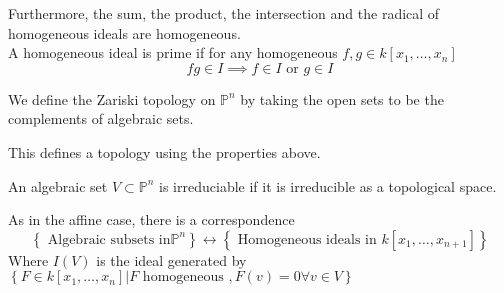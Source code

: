 \documentclass[../main.tex]{subfiles}
\begin{document}
Furthermore, the sum, the product, the intersection and the radical of homogeneous ideals are homogeneous.\\
A homogeneous ideal is prime if for any homogeneous $f,g\in k[x_1,\ldots,x_n]$ 
\[ 
fg\in I \implies f\in I \text{ or } g\in I
\]
\begin{defn}
We define the Zariski topology on $ \mathbb{P}^{n}$ by taking the open sets to be the complements of algebraic sets.	
\end{defn}
This defines a topology using the properties above.
\begin{defn}
	An algebraic set $V \subset \mathbb{P}^{n}$ is irreduciable if it is irreducible as a topological space.
\end{defn}
As in the affine case, there is a correspondence
\[ 
	\left\{ \text{ Algebraic subsets in} \mathbb{P}^{n} \right\} \leftrightarrow \left\{ \text{ Homogeneous ideals in  } k[x_1,\ldots,x_{n+1} ]  \right\} 
\]
Where $I( V) $ is the ideal generated by $ \left\{ F \in k[x_1,\ldots,x_n]| F \text{ homogeneous } ,F( v) =0 \forall v\in V   \right\} $ 
\end{document}
